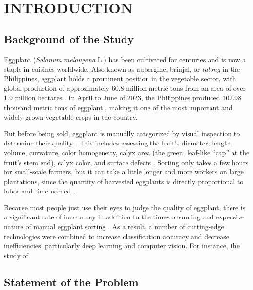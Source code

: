 \chapter{INTRODUCTION}

{\baselineskip
\section{Background of the Study}

Eggplant (\textit{Solanum melongena} L.) has been cultivated for centuries and is now a staple in cuisines worldwide. Also known as aubergine, brinjal, or \textit{talong} in the Philippines, eggplant holds a prominent position in the vegetable sector, with global production of approximately 60.8 million metric tons from an area of over 1.9 million hectares \citep{FAOSTAT_EggplantProduction}. In April to June of 2023, the Philippines produced 102.98 thousand metric tons of eggplant \citep{PSA_Eggplant_2023}, making it one of the most important and widely grown vegetable crops in the country.

But before being sold, eggplant is manually categorized by visual inspection to determine their quality \citep{sun2025novel}. This includes assessing the fruit's diameter, length, volume, curvature, color homogeneity, calyx area (the green, leaf-like “cap” at the fruit's stem end), calyx color, and surface defects \citep{lyu2025agronomic,lalam2025automatic}. Sorting only takes a few hours for small-scale farmers, but it can take a little longer and more workers on large plantations, since the quantity of harvested eggplants is directly proportional to labor and time needed \citep{Khan2025UsingCV}.

Because most people just use their eyes to judge the quality of eggplant, there is a significant rate of inaccuracy in addition to the time-consuming and expensive nature of manual eggplant sorting \citep{Waghmare2025Comprehensive}.  As a result, a number of cutting-edge technologies were combined to increase classification accuracy and decrease inefficiencies, particularly deep learning and computer vision.  For instance, the study of



\section{Statement of the Problem}

}
